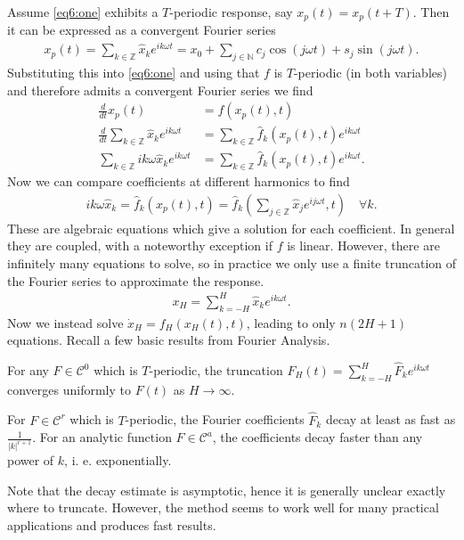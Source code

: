 	Assume \eqref{eq6:one} exhibits a $T$-periodic response, say $x_{p}(t) = x_{p}(t+T)$. Then it can be expressed as a convergent Fourier series
	\begin{align}
		x_p(t) = \sum_{k \in \mathbb{Z}}^{} \hat{x}_{k}e^{ik\omega t} = x_0 + \sum_{j \in \mathbb{N}}^{} c_j \cos(j \omega t) + s_j \sin(j \omega t).
	\end{align}
	Substituting this into \eqref{eq6:one} and using that $f$ is $T$-periodic (in both variables) and therefore admits a convergent Fourier series we find
	\begin{subequations}
	\begin{align}
		\frac{d}{dt}x_p(t)  &= 	f(x_p(t), t)\\
		\frac{d}{dt}\sum_{k \in \mathbb{Z}}^{} \hat{x}_k e^{ik \omega t}
				    &=	\sum_{k \in \mathbb{Z}}^{} \hat{f}_{k}(x_p(t), t) e^{i k \omega t} \\
		\sum_{k \in \mathbb{Z}}^{}  i k \omega \hat{x}_{k}e^{ik \omega t}	
				    &= \sum_{k \in \mathbb{Z}}^{} \hat{f}_{k} (x_p(t), t) e^{ik \omega t}.
	\end{align}
\end{subequations}
	Now we can compare coefficients at different harmonics to find
	\begin{align}
		ik \omega \hat{x}_{k} = \hat{f}_{k}(x_{p}(t), t) = \hat{f}_{k}\left( \sum_{j \in \mathbb{Z}}^{} \hat{x}_{j}e^{ij \omega t}, t \right) \quad \forall k.
	\end{align}
	These are algebraic equations which give a solution for each coefficient. In general they are coupled, with a noteworthy exception if $f$ is linear. However, there are infinitely many equations to solve, so in practice we only use a finite truncation of the Fourier series to approximate the response. 
	\begin{align}
		{x}_{H} = \sum_{k=-H}^{H} \hat{x}_{k}e^{ik \omega t}.
	\end{align}
	Now we instead solve $\dot{x}_H = f_{H}(x_{H}(t), t)$, leading to only $n(2H+1)$ equations.	
Recall a few basic results from Fourier Analysis.
\begin{theorem}[]
	For any $F\in \mathcal{C}^0$ which is $T$-periodic, the truncation $F_{H}(t) = \sum_{k=-H}^{H} \hat{F}_{k}e^{ik \omega t}$ converges uniformly to $F(t)$ as $H \to \infty $.
\end{theorem}
\begin{theorem}
	For $F\in \mathcal{C}^{r}$ which is $T$-periodic, the Fourier coefficients $\hat{F}_{k}$ decay at least as fast as $\frac{1}{|k|^{r+1}}$. For an analytic function $F\in \mathcal{C}^a$, the coefficients decay faster than any power of $k$, i. e. exponentially.
\end{theorem}
\begin{remark}[]
	Note that the decay estimate is asymptotic, hence it is generally unclear exactly where to truncate. However, the method seems to work well for many practical applications and produces fast results.
\end{remark}

